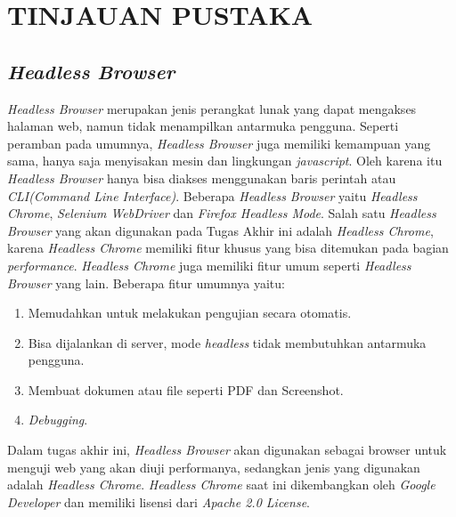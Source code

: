 \chapter{TINJAUAN PUSTAKA}
	\section{\textit{Headless Browser}}
		\textit{Headless Browser} merupakan jenis perangkat lunak yang dapat mengakses halaman web, namun tidak menampilkan antarmuka pengguna. Seperti peramban pada umumnya, \textit{Headless Browser} juga memiliki kemampuan yang sama, hanya saja menyisakan mesin dan lingkungan \textit{javascript}. Oleh karena itu \textit{Headless Browser} hanya bisa diakses menggunakan baris perintah atau \textit{CLI(Command Line Interface)}\cite{headless_browser}. Beberapa \textit{Headless Browser} yaitu \textit{Headless Chrome}, \textit{Selenium WebDriver} dan \textit{Firefox Headless Mode}. Salah satu \textit{Headless Browser} yang akan digunakan pada Tugas Akhir ini adalah \textit{Headless Chrome}, karena \textit{Headless Chrome} memiliki fitur khusus yang bisa ditemukan pada bagian \textit{performance}. \textit{Headless Chrome} juga memiliki fitur umum seperti \textit{Headless Browser} yang lain. Beberapa fitur umumnya yaitu\cite{headless_browser_2}:
		
		\begin{enumerate}
			\item Memudahkan untuk melakukan pengujian secara otomatis.
			\item Bisa dijalankan di server, mode \textit{headless} tidak membutuhkan antarmuka pengguna.
			\item Membuat dokumen atau file seperti PDF dan Screenshot.
			\item \textit{Debugging}.\\
		\end{enumerate}

		\indent Dalam tugas akhir ini, \textit{Headless Browser} akan digunakan sebagai browser untuk menguji web yang akan diuji performanya, sedangkan jenis yang digunakan adalah \textit{Headless Chrome}. \textit{Headless Chrome} saat ini dikembangkan oleh \textit{Google Developer} dan memiliki lisensi dari \textit{Apache 2.0 License}.
			
